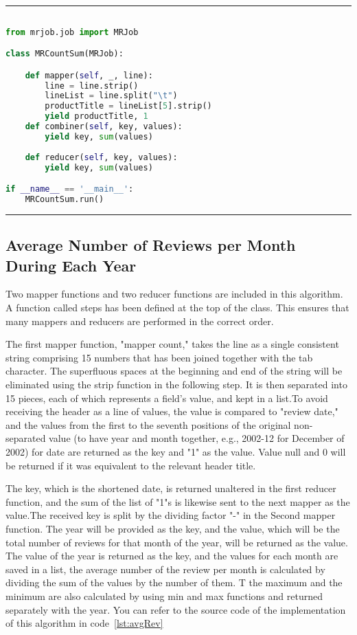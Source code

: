 \rule{200 pt}{0.5 pt} 

\renewcommand{\lstlistingname}{Code}
\lstset{style=mystyle}
\begin{lstlisting}[language=Python, caption={Number of Reviews for each Product}, label={lst:reviewsProduct}, mathescape = true, breaklines=true]

from mrjob.job import MRJob

class MRCountSum(MRJob):

    def mapper(self, _, line):
        line = line.strip()  
        lineList = line.split("\t")
        productTitle = lineList[5].strip()
        yield productTitle, 1
    def combiner(self, key, values):
        yield key, sum(values)
        
    def reducer(self, key, values):
        yield key, sum(values)

if __name__ == '__main__':
    MRCountSum.run()

\end{lstlisting}

\rule{200 pt}{0.5 pt} 

\subsection{Average Number of Reviews per Month During Each Year} 
Two mapper functions and two reducer functions are included in this algorithm. A function called steps has been defined at the top of the class. This ensures that many mappers and reducers are performed in the correct order.

The first mapper function, "mapper count," takes the line as a single consistent string comprising 15 numbers that has been joined together with the tab character. The superfluous spaces at the beginning and end of the string will be eliminated using the strip function in the following step. It is then separated into 15 pieces, each of which represents a field's value, and kept in a list.To avoid receiving the header as a line of values, the value is compared to "review date," and the values from the first to the seventh positions of the original non-separated value (to have year and month together, e.g., 2002-12 for December of 2002) for date are returned as the key and "1" as the value. Value null and 0 will be returned if it was equivalent to the relevant header title.

The key, which is the shortened date, is returned unaltered in the first reducer function, and the sum of the list of "1"s is likewise sent to the next mapper as the value.The received key is split by the dividing factor "-" in the Second mapper function. The year will be provided as the key, and the value, which will be the total number of reviews for that month of the year, will be returned as the value. The value of the year is returned as the key, and the values for each month are saved in a list, the average number of the review per month is calculated by dividing the sum of the values by the number of them. T the maximum and the minimum are also calculated by using min and max functions and returned separately with the year. You can refer to the source code of the implementation of this algorithm in code~\ref{lst:avgRev}


